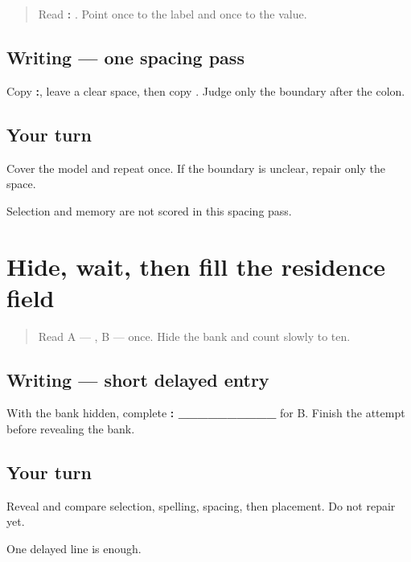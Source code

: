 \begin{quote}
Read \textbf{: }. Point once to the label and once to the value.
\end{quote}

\subsection*{Writing — one spacing pass}
Copy \textbf{:}, leave a clear space, then copy \textbf{}. Judge only the boundary after the colon.

\subsection*{Your turn}
Cover the model and repeat once. If the boundary is unclear, repair only the space.

\begin{tcolorbox}[breakable,colback=teal!4,colframe=teal!35!black,title={Before you move on}]
Selection and memory are not scored in this spacing pass.
\end{tcolorbox}
\section[\texorpdfstring{\pa{ਰਿਹਾਇਸ਼}: \_\_\_\_\_\_\_\_\_\_ (residence field …)}{ਰਿਹਾਇਸ਼: \_\_\_\_\_\_\_\_\_\_ (residence field …)}]{Hide, wait, then fill the residence field}

\label{lesson:PA-W04-residence-delayed}



\begin{quote}
Read A — \textbf{}, B — \textbf{} once. Hide the bank and count slowly to ten.
\end{quote}

\subsection*{Writing — short delayed entry}
With the bank hidden, complete \textbf{: \_\_\_\_\_\_\_\_\_\_} for B. Finish the attempt before revealing the bank.

\subsection*{Your turn}
Reveal and compare selection, spelling, spacing, then placement. Do not repair yet.

\begin{tcolorbox}[breakable,colback=teal!4,colframe=teal!35!black,title={Before you move on}]
One delayed line is enough.
\end{tcolorbox}

